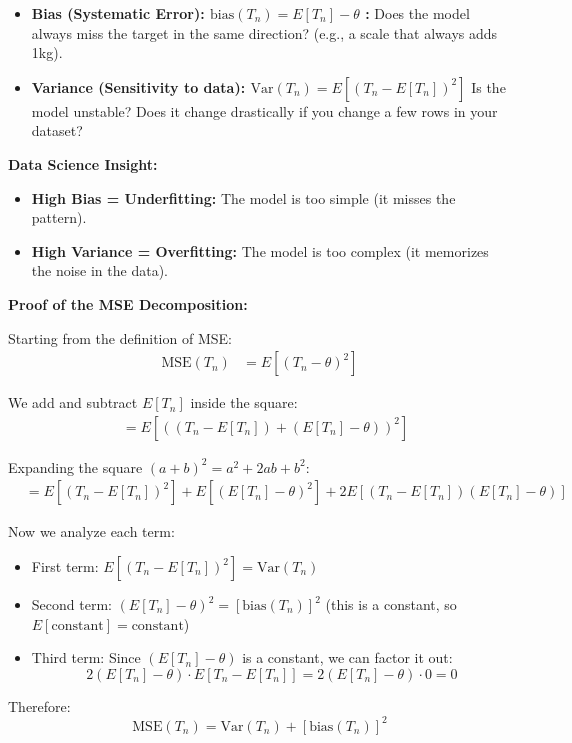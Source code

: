 \begin{itemize}
    \item \textbf{Bias (Systematic Error):  $\text{bias}(T_n) = E[T_n] - \theta$  :} Does the model always miss the target in the same direction? (e.g., a scale that always adds 1kg).
    \item \textbf{Variance (Sensitivity to data): $\text{Var}(T_n) = E\left[(T_n - E[T_n])^2\right]$} Is the model unstable? Does it change drastically if you change a few rows in your dataset?
\end{itemize}

\pagebreak
\textbf{Data Science Insight:} 
\begin{itemize}
    \item \textbf{High Bias = Underfitting:} The model is too simple (it misses the pattern).
    \item \textbf{High Variance = Overfitting:} The model is too complex (it memorizes the noise in the data).
\end{itemize}

\vs

{\footnotesize
\textbf{Proof of the MSE Decomposition:}

Starting from the definition of MSE:
\begin{align*}
\text{MSE}(T_n) &= E\left[(T_n - \theta)^2\right]
\end{align*}

We add and subtract $E[T_n]$ inside the square:
\begin{align*}
&= E\left[\left((T_n - E[T_n]) + (E[T_n] - \theta)\right)^2\right]
\end{align*}

Expanding the square $(a + b)^2 = a^2 + 2ab + b^2$:
\begin{align*}
&= E\left[(T_n - E[T_n])^2\right] + E\left[(E[T_n] - \theta)^2\right] + 2E\left[(T_n - E[T_n])(E[T_n] - \theta)\right]
\end{align*}

Now we analyze each term:
\begin{itemize}
    \item First term: $E\left[(T_n - E[T_n])^2\right] = \text{Var}(T_n)$
    \item Second term: $(E[T_n] - \theta)^2 = [\text{bias}(T_n)]^2$ (this is a constant, so $E[\text{constant}] = \text{constant}$)
    \item Third term: Since $(E[T_n] - \theta)$ is a constant, we can factor it out:
    \[
    2(E[T_n] - \theta) \cdot E[T_n - E[T_n]] = 2(E[T_n] - \theta) \cdot 0 = 0
    \]
\end{itemize}

Therefore:
\[
\text{MSE}(T_n) = \text{Var}(T_n) + [\text{bias}(T_n)]^2
\]
}

